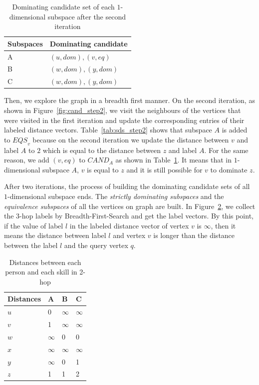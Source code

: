 \begin{table}[H]
    \centering

    \begin{tabular}{|l|l|}
    \hline
    Subspaces & Dominating candidate \\ \hline
    A         & $(u, dom), (v, eq)$            \\ \hline
    B         & $(w, dom), (y, dom)$            \\ \hline
    C         & $(w, dom), (y, dom)$            \\ \hline
    \end{tabular}
    \caption{Dominating candidate set of each $1$-dimensional subspace after the second iteration}
    \label{tab:cand_set_step2}
\end{table}


Then, we explore the graph in a breadth first manner. On the second iteration, as shown in Figure~\ref{fig:cand_step2}, we visit the neighbours of the vertices that were visited in the first iteration and update the corresponding entries of their labeled distance vectors. Table~\ref{tab:sds_step2} shows that subspace $A$ is added to $\mathit{EQS}_v$ because on the second iteration we update the distance between $v$ and label $A$ to $2$ which is equal to the distance between $z$ and label $A$. For the same reason, we add $(v, eq)$ to $\mathit{CAND}_A$ as shown in Table~\ref{tab:cand_set_step2}. It means that in $1$-dimensional subspace $A$, $v$ is equal to $z$ and it is still possible for $v$ to dominate $z$.

After two iterations, the process of building the dominating candidate sets of all $1$-dimensional subspace ends. The \emph{strictly dominating subspaces} and the \emph{equivalence subspaces} of all the vertices on graph are built. In Figure~\ref{tab:d_hops_distance}, we collect the $3$-hop labels by Breadth-First-Search and get the label vectors. By this point, if the value of label $l$ in the labeled distance vector of vertex $v$ is $\infty$, then it means the distance between label $l$ and vertex $v$ is longer than the distance between the label $l$ and the query vertex $q$.

\begin{table}[h]
    \centering
    \begin{tabular}{llll}
    \hline
    Distances & A & B & C \\ \hline
    $u$       & 0 & $\infty$ & $\infty$ \\ \hline
    $v$       & 1 & $\infty$ & $\infty$ \\ \hline
    $w$       & $\infty$ & 0 & 0 \\ \hline
    $x$       & $\infty$ & $\infty$ & $\infty$ \\ \hline
    $y$       & $\infty$ & 0 & 1 \\ \hline
    $z$       & 1 & 1 & 2 \\ \hline
    \end{tabular}
    \caption{Distances between each person and each skill in 2-hop}
    \label{tab:d_hops_distance}
\end{table}

